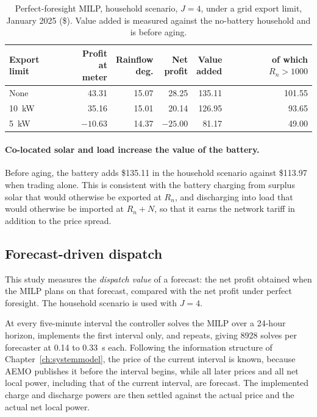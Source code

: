 \begin{table}[htbp]
    \centering
    \small
    \caption{Perfect-foresight MILP, household scenario, $J=4$, under a grid export limit,
    January 2025 (\$). Value added is measured against the no-battery household and is
    before aging.}
    \label{tab:milp:export}
    \begin{tabular}{@{}lrrrrr@{}}
        \toprule
        Export limit & \shortstack{Profit\\at meter} & \shortstack{Rainflow\\deg.} &
        \shortstack{Net\\profit} & \shortstack{Value\\added} &
        \shortstack{of which\\$R_n > 1000$} \\
        \midrule
        None  & 43.31     & 15.07 & 28.25     & 135.11 & 101.55 \\
        10~kW & 35.16     & 15.01 & 20.14     & 126.95 & 93.65 \\
        5~kW  & $-10.63$  & 14.37 & $-25.00$  & 81.17  & 49.00 \\
        \bottomrule
    \end{tabular}
\end{table}

\paragraph{Co-located solar and load increase the value of the battery.}
Before aging, the battery adds \$135.11 in the household scenario against \$113.97 when
trading alone. This is consistent with the battery charging from surplus solar that
would otherwise be exported at $R_n$, and discharging into load that would otherwise be
imported at $R_n + N$, so that it earns the network tariff in addition to the price
spread.

\subsection{Forecast-driven dispatch}
\label{sec:results:mpc}

This study measures the \emph{dispatch value} of a forecast: the net profit obtained
when the MILP plans on that forecast, compared with the net profit under perfect
foresight. The household scenario is used with $J = 4$.

At every five-minute interval the controller solves the MILP over a 24-hour horizon,
implements the first interval only, and repeats, giving 8928 solves per forecaster at
0.14 to 0.33~s each. Following the information structure of
Chapter~\ref{ch:systemmodel}, the price of the current interval is known, because AEMO
publishes it before the interval begins, while all later prices and all net local power,
including that of the current interval, are forecast. The implemented charge and
discharge powers are then settled against the actual price and the actual net local
power.

